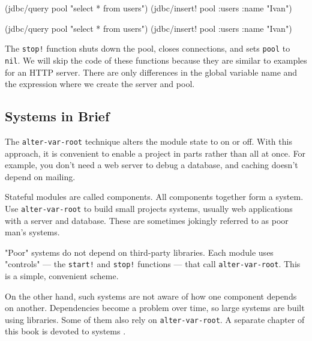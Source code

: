 \ifx\DEVICETYPE\MOBILE

\begin{english}
  \begin{clojure}
(jdbc/query pool "select * from users")
(jdbc/insert! pool
  :users {:name "Ivan"})
  \end{clojure}
\end{english}

\else

\begin{english}
  \begin{clojure}
(jdbc/query pool "select * from users")
(jdbc/insert! pool :users {:name "Ivan"})
  \end{clojure}
\end{english}

\fi

The \verb|stop!| function shuts down the pool, closes connections, and sets \verb|pool| to \verb|nil|.
We will skip the code of these functions because they are similar to examples for an HTTP server.
There are only differences in the global variable name and the expression where we create the server and pool.

\subsection{Systems in Brief}


\label{systems-intro}

The \verb|alter-var-root| technique alters the module state to on or off. With this approach, it is convenient to enable a project in parts rather than all at once. For example, you don't need a web server to debug a database, and caching doesn't depend on mailing.

Stateful modules are called components.
All components together form a system.
Use \verb|alter-var-root| to build small projects systems, usually web applications with a server and database. These are sometimes jokingly referred to as poor man's systems.


"Poor" systems do not depend on third-party libraries.
Each module uses "controls" — the \verb|start!| and \verb|stop!| functions — that call \verb|alter-var-root|.
This is a simple, convenient scheme.

On the other hand, such systems are not aware of how one component depends on another.
Dependencies become a problem over time, so large systems are built using libraries.
Some of them also rely on \verb|alter-var-root|.
A separate chapter of this book is devoted to systems .

